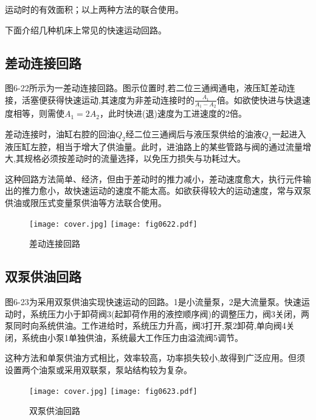\noindent 运动时的有效面积；以上两种方法的联合使用。

下面介绍几种机床上常见的快速运动回路。

\subsection{差动连接回路}

\begin{spacing}{2.0}
图6-22所示为一差动连接回路。图示位置时,若二位三通阀通电，液压缸差动连接，活塞便获得快速运动,其速度为非差动连接时的$ \displaystyle\frac{A_{1}}{A_{1}-A_{2}}$倍。如欲使快进与快退速度相等，则需使$A_{1}=2A_{2}$，此时快进(退)速度为工进速度的2倍。
\end{spacing}

差动连接时，油缸右腔的回油$Q_{2}$经二位三通阀后与液压泵供给的油液$Q_{1}$一起进入液压缸左腔，相当于增大了供油量。此时，进油路上的某些管路与阀的通过流量增大,其规格必须按差动时的流量选择，以免压力损失与功耗过大。

这种回路方法简单、经济，但由于差动时的推力减小，差动速度愈大，执行元件输出的推力愈小，故快速运动的速度不能太高。如欲获得较大的运动速度，常与双泵供油或限压式变量泵供油等方法联合使用。

\begin{figure}
\centering
\ifOpenSource
\texttt{[image: cover.jpg]}
\else
\texttt{[image: fig0622.pdf]}
\fi
\caption{差动连接回路}
\label{fig:fig0622}
\end{figure}

\subsection{双泵供油回路}

图6-23为采用双泵供油实现快速运动的回路。1是小流量泵，2是大流量泵。快速运动时，系统压力小于卸荷阀3(起卸荷作用的液控顺序阀)的调整压力，阀3关闭，两泵同时向系统供油。工作进给时，系统压力升高，阀3打开,泵2卸荷,单向阀4关闭，系统由小泵1单独供油，系统最大工作压力由溢流阀5调节。

这种方法和单泵供油方式相比，效率较高，功率损失较小,故得到广泛应用。但须设置两个油泵或采用双联泵，泵站结构较为复杂。

\begin{figure}
\centering
\ifOpenSource
\texttt{[image: cover.jpg]}
\else
\texttt{[image: fig0623.pdf]}
\fi
\caption{双泵供油回路}
\label{fig:fig0623}
\end{figure}

